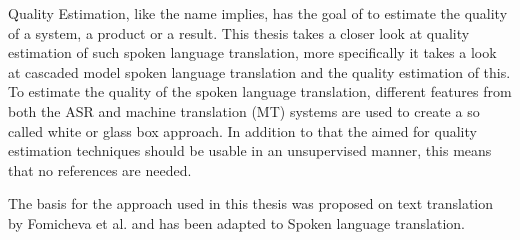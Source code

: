 Quality Estimation, like the name implies, has the goal of to estimate the quality of a system, a product or a result. 
This thesis takes a closer look at quality estimation of such spoken language translation, more specifically it takes a look at cascaded model spoken language translation and the quality estimation of this. 
To estimate the quality of the spoken language translation, different features from both the ASR and machine translation (MT) systems are used to create a so called white or glass box approach. In addition to that the aimed for quality estimation techniques should be usable in an unsupervised manner, this means that no references are needed. 

The basis for the approach used in this thesis was proposed on text translation by Fomicheva et al. \cite{fomicheva2020unsupervised} and has been adapted to Spoken language translation. 

